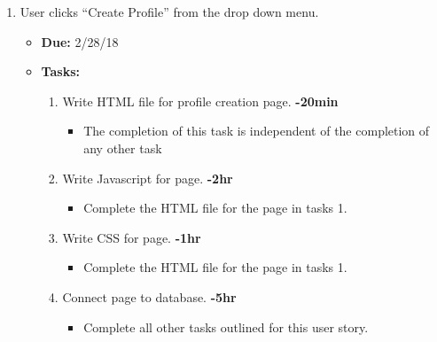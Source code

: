 \documentclass[12pt]{article}
\begin{document}
\begin{enumerate}
    \item User clicks “Create Profile” from the drop down menu.
      \begin{itemize}
        \item \textbf{Due:} 2/28/18
        \item \textbf{Tasks:}
          \begin{enumerate}
            \item Write HTML file for profile creation page. \textbf{-20min}
              \begin{itemize}
                \item The completion of this task is independent of the completion of any other task
              \end{itemize}
            \item Write Javascript for page. \textbf{-2hr}
              \begin{itemize}
                \item Complete the HTML file for the page in tasks 1.
              \end{itemize}
            \item Write CSS for page. \textbf{-1hr}
              \begin{itemize}
                \item Complete the HTML file for the page in tasks 1.
              \end{itemize}
            \item Connect page to database. \textbf{-5hr}
              \begin{itemize}
                \item Complete all other tasks outlined for this user story.
              \end{itemize}
          \end{enumerate}
      \end{itemize}


\end{enumerate}
\end{document}
